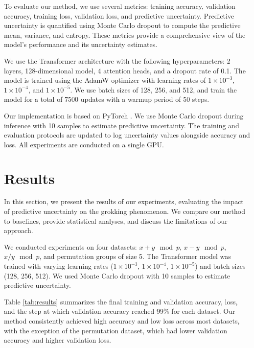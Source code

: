 \documentclass{article} %
\begin{document}
To evaluate our method, we use several metrics: training accuracy, validation accuracy, training loss, validation loss, and predictive uncertainty. Predictive uncertainty is quantified using Monte Carlo dropout to compute the predictive mean, variance, and entropy. These metrics provide a comprehensive view of the model's performance and its uncertainty estimates.

We use the Transformer architecture \cite{vaswani2017attention} with the following hyperparameters: 2 layers, 128-dimensional model, 4 attention heads, and a dropout rate of 0.1. The model is trained using the AdamW optimizer \cite{loshchilov2017adamw} with learning rates of \(1 \times 10^{-3}\), \(1 \times 10^{-4}\), and \(1 \times 10^{-5}\). We use batch sizes of 128, 256, and 512, and train the model for a total of 7500 updates with a warmup period of 50 steps.

Our implementation is based on PyTorch \cite{paszke2019pytorch}. We use Monte Carlo dropout during inference with 10 samples to estimate predictive uncertainty. The training and evaluation protocols are updated to log uncertainty values alongside accuracy and loss. All experiments are conducted on a single GPU.

\section{Results}
\label{sec:results}

In this section, we present the results of our experiments, evaluating the impact of predictive uncertainty on the grokking phenomenon. We compare our method to baselines, provide statistical analyses, and discuss the limitations of our approach.

We conducted experiments on four datasets: \(x + y \mod p\), \(x - y \mod p\), \(x / y \mod p\), and permutation groups of size 5. The Transformer model was trained with varying learning rates (\(1 \times 10^{-3}\), \(1 \times 10^{-4}\), \(1 \times 10^{-5}\)) and batch sizes (128, 256, 512). We used Monte Carlo dropout with 10 samples to estimate predictive uncertainty.

Table \ref{tab:results} summarizes the final training and validation accuracy, loss, and the step at which validation accuracy reached 99\% for each dataset. Our method consistently achieved high accuracy and low loss across most datasets, with the exception of the permutation dataset, which had lower validation accuracy and higher validation loss.
\end{document}
